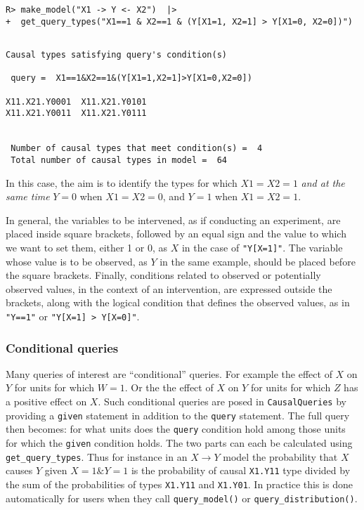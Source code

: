 \documentclass[
  11pt,
  article]{jss}
\begin{document}
\begin{verbatim}
R> make_model("X1 -> Y <- X2")  |>
+  get_query_types("X1==1 & X2==1 & (Y[X1=1, X2=1] > Y[X1=0, X2=0])")
\end{verbatim}

\begin{verbatim}

Causal types satisfying query's condition(s)  

 query =  X1==1&X2==1&(Y[X1=1,X2=1]>Y[X1=0,X2=0]) 

X11.X21.Y0001  X11.X21.Y0101
X11.X21.Y0011  X11.X21.Y0111


 Number of causal types that meet condition(s) =  4
 Total number of causal types in model =  64
\end{verbatim}

In this case, the aim is to identify the types for which \(X1=X2=1\)
\emph{and at the same time} \(Y=0\) when \(X1 = X2 = 0\), and \(Y = 1\)
when \(X1 = X2 = 1\).

In general, the variables to be intervened, as if conducting an
experiment, are placed inside square brackets, followed by an equal sign
and the value to which we want to set them, either 1 or 0, as \(X\) in
the case of \texttt{"Y{[}X=1{]}"}. The variable whose value is to be
observed, as \(Y\) in the same example, should be placed before the
square brackets. Finally, conditions related to observed or potentially
observed values, in the context of an intervention, are expressed
outside the brackets, along with the logical condition that defines the
observed values, as in \texttt{"Y==1"} or
\texttt{"Y{[}X=1{]}\ \textgreater{}\ Y{[}X=0{]}"}.

\hypertarget{conditional-queries}{%
\subsubsection{Conditional queries}\label{conditional-queries}}

Many queries of interest are ``conditional'' queries. For example the
effect of \(X\) on \(Y\) for units for which \(W= 1\). Or the the effect
of \(X\) on \(Y\) for units for which \(Z\) has a positive effect on
\(X\). Such conditional queries are posed in \texttt{CausalQueries} by
providing a \texttt{given} statement in addition to the \texttt{query}
statement. The full query then becomes: for what units does the
\texttt{query} condition hold among those units for which the
\texttt{given} condition holds. The two parts can each be calculated
using \texttt{get\_query\_types}. Thus for instance in an
\(X \rightarrow Y\) model the probability that \(X\) causes \(Y\) given
\(X=1 \& Y=1\) is the probability of causal \texttt{X1.Y11} type divided
by the sum of the probabilities of types \texttt{X1.Y11} and
\texttt{X1.Y01}. In practice this is done automatically for users when
they call \texttt{query\_model()} or \texttt{query\_distribution()}.
\end{document}
